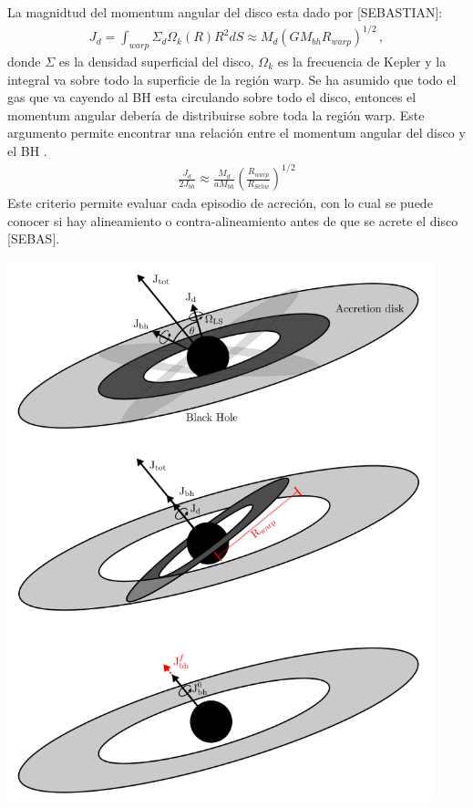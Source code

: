 La magnidtud del momentum angular del disco esta dado por [SEBASTIAN]:
%
\begin{align}
    J_{d}=\int_{warp} \Sigma_{d}\Omega_{k}(R)R^{2}dS \approx M_{d}(GM_{bh}R_{warp})^{1/2}\,,
    \label{eq: magnitid J_disco}
\end{align}
%
donde $\Sigma$ es la densidad superficial del disco, $\Omega_{k}$ es la frecuencia de Kepler y la integral va sobre todo la superficie de la región warp. Se ha asumido que todo el gas que va cayendo al BH esta circulando sobre todo el disco, entonces el momentum angular debería de distribuirse sobre toda la región warp. Este argumento permite encontrar una relación entre el momentum angular del disco y el BH \cite{king2005}.
%
\begin{align}
    \frac{J_{d}}{2J_{bh}}\approx \frac{M_{d}}{aM_{bh}}\left(\frac{R_{warp}}{R_{Schw}} \right)^{1/2}
\end{align}
%
Este criterio permite evaluar cada episodio de acreción, con lo cual se puede conocer si hay alineamiento o contra-alineamiento antes de que se acrete el disco [SEBAS]. 

\begin{center}
\includegraphics[scale=.5]{./figures/4_Modelo_Spin/evolucion_spin.png}
\label{fig: evolucion espin}
\end{center}


